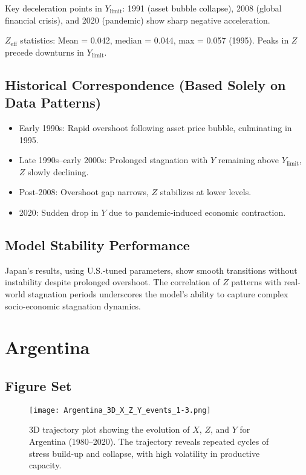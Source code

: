 \documentclass[12pt,a4paper]{article}
\begin{document}
Key deceleration points in $Y_{\text{limit}}$: 1991 (asset bubble collapse), 2008 (global financial crisis), and 2020 (pandemic) show sharp negative acceleration.

$Z_{\text{eff}}$ statistics: Mean = 0.042, median = 0.044, max = 0.057 (1995). Peaks in $Z$ precede downturns in $Y_{\text{limit}}$.

\subsection{Historical Correspondence (Based Solely on Data Patterns)}
\begin{itemize}
    \item Early 1990s: Rapid overshoot following asset price bubble, culminating in 1995.
    \item Late 1990s–early 2000s: Prolonged stagnation with $Y$ remaining above $Y_{\text{limit}}$, $Z$ slowly declining.
    \item Post-2008: Overshoot gap narrows, $Z$ stabilizes at lower levels.
    \item 2020: Sudden drop in $Y$ due to pandemic-induced economic contraction.
\end{itemize}

\subsection{Model Stability Performance}
Japan’s results, using U.S.-tuned parameters, show smooth transitions without instability despite prolonged overshoot. The correlation of $Z$ patterns with real-world stagnation periods underscores the model’s ability to capture complex socio-economic stagnation dynamics.
\section{Argentina}
\subsection{Figure Set}

\begin{figure}[H]
    \centering
    \texttt{[image: Argentina\_3D\_X\_Z\_Y\_events\_1-3.png]}
    \caption{3D trajectory plot showing the evolution of $X$, $Z$, and $Y$ for Argentina (1980--2020). The trajectory reveals repeated cycles of stress build-up and collapse, with high volatility in productive capacity.}
    \label{fig:argentina_3d_x_z_y}
\end{figure}
\end{document}

